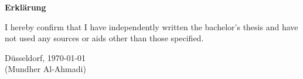 \documentclass[12pt,english,titlepage,a4paper]{article}
\begin{document}
\pagebreak\noindent
\textbf{\LARGE Erkl\"arung}

\bigskip\bigskip
\noindent 
I hereby confirm that I have independently written the 
bachelor's thesis and have not used any sources or aids 
other than those specified.
\bigskip
\noindent

\bigskip\bigskip\bigskip
\noindent
D\"usseldorf, \today \\
(Mundher Al-Ahmadi)

% 
\end{document}
